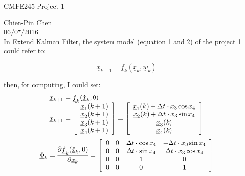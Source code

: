\documentclass{article}
\begin{document}
\begin{center}
CMPE245 Project 1
\end{center}
Chien-Pin Chen\\
06/07/2016\\

\noindent In Extend Kalman Filter, the system model (equation 1 and 2) of the project 1 could refer to:

\begin{equation}
	\underline{x}_{k + 1}  = \underline{f}_k (\underline{x}_k ,\underline{w}_k )
\end{equation}

then, for computing, I could set:
\begin{equation}
	\begin{array}{l}
	\underline{x}_{k + 1}  = \underline{f}_k (\hat{\underline{x}}_k ,0) \\ 
	 \underline{x}_{k + 1}  = \left[ {\begin{array}{*{20}c}
	   {\underline{x}_1 (k + 1)}  \\
	   {\underline{x}_2 (k + 1)}  \\
	   {\underline{x}_3 (k + 1)}  \\
	   {\underline{x}_4 (k + 1)}  \\
	\end{array}} \right] = \left[ {\begin{array}{*{20}c}
	   {\underline{x}_1 (k) + \Delta t \cdot x_3 \cos x_4 }  \\
	   {\underline{x}_2 (k) + \Delta t \cdot x_3 \sin x_4 }  \\
	   {\underline{x}_3 (k)}  \\
	   {\underline{x}_4 (k)}  \\
	\end{array}} \right] \\ 
	 \end{array}
\end{equation}
\begin{equation}
	\underline{\Phi} _k  = \frac{{\partial \underline{f}_k (\hat{\underline{x}}_k ,0)}}{{\partial \underline{x}_k }} = \left[ {\begin{array}{*{20}c}
	   0 & 0 & {\Delta t \cdot \cos x_4 } & { - \Delta t \cdot x_3 \sin x_4 }  \\
	   0 & 0 & {\Delta t \cdot \sin x_4 } & {\Delta t \cdot x_3 \cos x_4 }  \\
	   0 & 0 & 1 & 0  \\
	   0 & 0 & 0 & 1  \\
	\end{array}} \right]
\end{equation}
\end{document}

